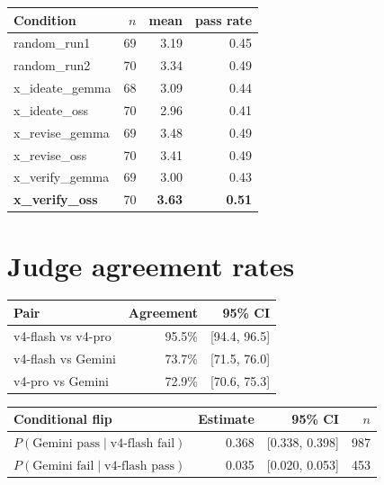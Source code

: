 \documentclass{article}
\begin{document}
\begin{table}[h]
  \centering
  \small
  \begin{tabular}{lrrr}
    \toprule
    Condition & $n$ & mean & pass rate \\
    \midrule
    random\_run1 & 69 & 3.19 & 0.45 \\
    random\_run2 & 70 & 3.34 & 0.49 \\
    x\_ideate\_gemma & 68 & 3.09 & 0.44 \\
    x\_ideate\_oss & 70 & 2.96 & 0.41 \\
    x\_revise\_gemma & 69 & 3.48 & 0.49 \\
    x\_revise\_oss & 70 & 3.41 & 0.49 \\
    x\_verify\_gemma & 69 & 3.00 & 0.43 \\
    \textbf{x\_verify\_oss} & 70 & \textbf{3.63} & \textbf{0.51} \\
    \bottomrule
  \end{tabular}
\end{table}

\section{Judge agreement rates}
\label{app:judgeagree}

\begin{table}[h]
  \centering
  \small
  \begin{tabular}{lrr}
    \toprule
    Pair & Agreement & 95\% CI \\
    \midrule
    v4-flash vs v4-pro & 95.5\% & [94.4, 96.5] \\
    v4-flash vs Gemini & 73.7\% & [71.5, 76.0] \\
    v4-pro vs Gemini & 72.9\% & [70.6, 75.3] \\
    \bottomrule
  \end{tabular}
\end{table}

\begin{table}[h]
  \centering
  \small
  \begin{tabular}{lrrr}
    \toprule
    Conditional flip & Estimate & 95\% CI & $n$ \\
    \midrule
    $P(\text{Gemini pass} \mid \text{v4-flash fail})$ & 0.368 & [0.338, 0.398] & 987 \\
    $P(\text{Gemini fail} \mid \text{v4-flash pass})$ & 0.035 & [0.020, 0.053] & 453 \\
    \bottomrule
  \end{tabular}
\end{table}
\end{document}
